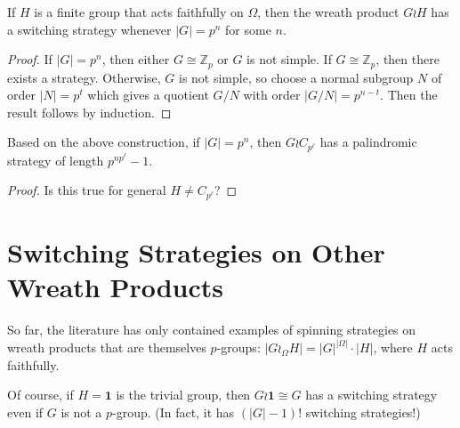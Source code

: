 \begin{corollary}
  If $H$ is a finite group that acts faithfully on $\Omega$, then the wreath product
  $G \wr H$ has a switching strategy whenever $|G| = p^n$ for some $n$.
\end{corollary}
\begin{proof}
  If $|G| = p^n$, then either $G \cong \mathbb{Z}_p$ or $G$ is not simple.
  If $G \cong \mathbb{Z}_p$, then there exists a strategy. Otherwise,
  $G$ is not simple, so choose a normal subgroup $N$ of order $|N| = p^t$
  which gives a quotient $G/N$ with order $|G/N| = p^{n-t}$. Then the
  result follows by induction.
\end{proof}
\begin{corollary}
  Based on the above construction, if $|G| = p^n$, then $G \wr C_{p^\ell}$
  has a palindromic strategy of length $p^{n p^\ell}-1$.
\end{corollary}
\begin{proof}
  Is this true for general $H \neq C_{p^\ell}$?
\end{proof}

%
%
\section{Switching Strategies on Other Wreath Products}
\label{sec:OtherSwitchingStrategies}

So far, the literature has only contained examples of spinning strategies on
wreath products that are themselves $p$-groups:
$|G \wr_\Omega H| = |G|^{|\Omega|} \cdot |H|$, where $H$ acts faithfully.

Of course, if $H = \textbf{1}$ is the trivial group, then
$G \wr \mathbf{1} \cong G$ has a switching strategy even if $G$ is not a $p$-group.
(In fact, it has $(|G|-1)!$ switching strategies!)

